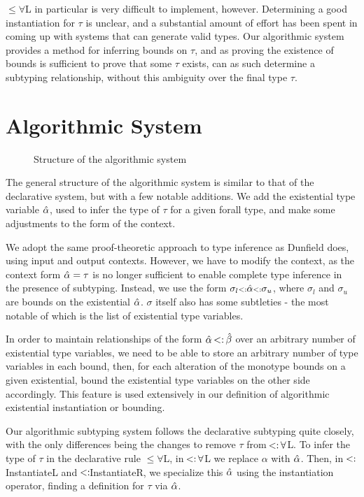 \documentclass{llncs}
\begin{document}
$\leq\forall$L in particular is very difficult to implement, however. Determining a good instantiation for $\tau$ is unclear, and a substantial amount of effort has been spent in coming up with systems that can generate valid types. Our algorithmic system provides a method for inferring bounds on $\tau$, and as proving the existence of bounds is sufficient to prove that some $\tau$ exists, can as such determine a subtyping relationship, without this ambiguity over the final type $\tau$.

\section{Algorithmic System}
\begin{figure}

\label{fig:cons}
\caption{Structure of the algorithmic system}
\end{figure}

The general structure of the algorithmic system is similar to that of the declarative system, but with a few notable additions. We add the existential type variable $\hat{\alpha}$, used to infer the type of $\tau$ for a given forall type, and make some adjustments to the form of the context.

We adopt the same proof-theoretic approach to type inference as Dunfield does, using input and output contexts. However, we have to modify the context, as the context form $\hat{\alpha}=\tau$ is no longer sufficient to enable complete type inference in the presence of subtyping. Instead, we use the form $\sigma_l {\scriptstyle{<:}} \hat{\alpha} {\scriptstyle{<:}} \sigma_u$, where $\sigma_l$ and $\sigma_u$ are bounds on the existential $\hat{\alpha}$. $\sigma$ itself also has some subtleties - the most notable of which is the list of existential type variables.

In order to maintain relationships of the form $\alphahat \st \betahat$ over an arbitrary number of existential type variables, we need to be able to store an arbitrary number of type variables in each bound, then, for each alteration of the monotype bounds on a given existential, bound the existential type variables on the other side accordingly. This feature is used extensively in our definition of algorithmic existential instantiation or bounding.

\begin{figure}

\end{figure}

Our algorithmic subtyping system follows the declarative subtyping quite closely, with the only differences being the changes to remove $\tau$ from $\st\forall$L. To infer the type of $\tau$ in the declarative rule $\leq\forall$L, in $\st\forall$L we replace $\alpha$ with $\hat{\alpha}$. Then, in $\st$InstantiateL and $\st$InstantiateR, we specialize this $\hat{\alpha}$ using the instantiation operator, finding a definition for $\tau$ via $\hat{\alpha}$.
\end{document}
